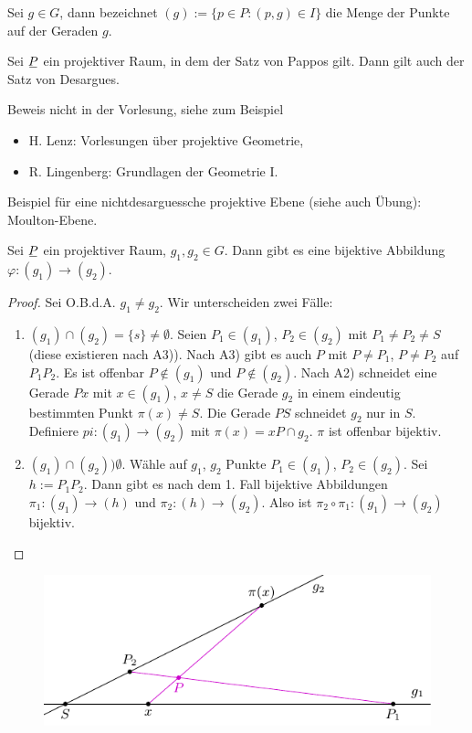 \begin{deno*}
 Sei $g \in G$, dann bezeichnet $(g) := \{ p \in P : (p,g) \in I \}$ die Menge der Punkte auf der Geraden $g$.
\end{deno*}

\begin{thm*}[Hessenberg]
 Sei $\proj$ ein projektiver Raum, in dem der Satz von Pappos gilt. Dann gilt auch der Satz von Desargues.
\end{thm*}

Beweis nicht in der Vorlesung, siehe zum Beispiel
\begin{itemize}
 \item H. Lenz: Vorlesungen über projektive Geometrie,
 \item R. Lingenberg: Grundlagen der Geometrie I.
\end{itemize}

Beispiel für eine nichtdesarguessche projektive Ebene (siehe auch Übung): Moulton-Ebene.

\begin{lem}
 Sei $\proj$ ein projektiver Raum, $g_1, g_2 \in G$. Dann gibt es eine bijektive Abbildung $\varphi:(g_1) \to (g_2)$.
\end{lem}

\begin{proof}
 Sei O.B.d.A. $g_1 \ne g_2$. Wir unterscheiden zwei Fälle:
 \begin{enumerate}
  \item $(g_1) \cap (g_2) = \{ s \} \ne \emptyset$. Seien $P_1 \in (g_1)$, $P_2 \in (g_2)$ mit $P_1 \ne P_2 \ne S$ (diese existieren nach A3)). Nach A3) gibt es auch $P$ mit $P \ne P_1$, $P \ne P_2$ auf $P_1 P_2$. Es ist offenbar $P \notin (g_1)$ und $P \notin (g_2)$. Nach A2) schneidet eine Gerade $Px$ mit $x \in (g_1)$, $x \ne S$ die Gerade $g_2$ in einem eindeutig bestimmten Punkt $\pi(x) \ne S$. Die Gerade $PS$ schneidet $g_2$ nur in $S$. Definiere $pi:(g_1) \to (g_2)$ mit $\pi( x ) = xP \cap g_2$. $\pi$ ist offenbar bijektiv.
  \item $(g_1) \cap (g_2) ) \emptyset$. Wähle  auf $g_1$, $g_2$ Punkte $P_1 \in (g_1)$, $P_2 \in (g_2)$. Sei $h := P_1 P_2$. Dann gibt es nach dem 1. Fall bijektive Abbildungen $\pi_1: (g_1) \to (h)$ und $\pi_2: (h) \to (g_2)$. Also ist $\pi_2 \circ \pi_1: (g_1) \to (g_2)$ bijektiv. \qedhere
 \end{enumerate}
\end{proof}

\begin{figure}[ht]
 \center
 \includegraphics[width=12cm]{img/lemma27}
\end{figure}

